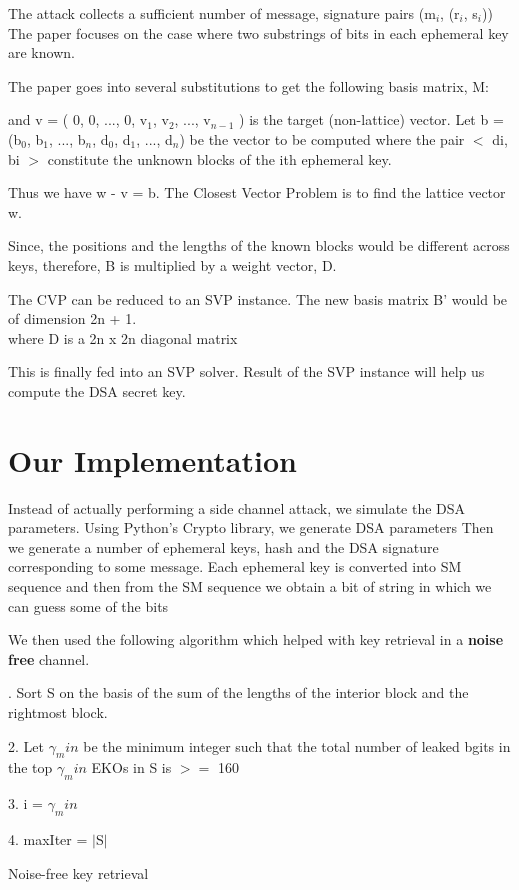 \documentclass[11pt]{article}
\begin{document}
The attack collects a sufficient number of message, signature pairs (m$_i$, (r$_i$, s$_i$))
The paper focuses on the case where two substrings of bits in each ephemeral key are known. 

The paper goes into several substitutions to get the following basis matrix, M:


and v = ( 0, 0, ..., 0, v$_1$, v$_2$, ..., v$_{n-1}$ ) is the target (non-lattice) vector.
Let b = (b$_0$, b$_1$, ..., b$_n$, d$_0$, d$_1$, ..., d$_n$) be the vector to be computed where the pair $<$ di, bi $>$ constitute the unknown blocks of the ith  ephemeral key. 

Thus we have w - v = b. The Closest Vector Problem is to find the lattice vector w. 

Since, the positions and the lengths of the known blocks would be different across keys, therefore, B is multiplied by a weight vector, D.

\pagebreak
The CVP can be reduced to an SVP instance. The new basis matrix B’ would be of dimension 2n + 1. \\


where D is a 2n x 2n diagonal matrix 

This is finally fed into an SVP solver.
Result of the SVP instance will help us compute the DSA secret key.

\section{Our Implementation}

Instead of actually performing a side channel attack, we simulate the DSA parameters. Using Python’s Crypto library, we generate DSA parameters
Then we generate a number of ephemeral keys, hash and the DSA signature corresponding to some message. Each ephemeral key is converted into SM sequence and then from the SM sequence we obtain a bit of string in which we can guess some of the bits\\



\pagebreak

We then used the following algorithm which helped with key retrieval in a \textbf{noise free} channel.\\


\begin{algorithm}[H]
. Sort S on the basis of the sum of the lengths of the interior block and the rightmost block.

2. Let $\gamma_min$ be the minimum integer such that the total number of leaked bgits in the top $\gamma_min$ EKOs in S is $>=$ 160

3. i = $\gamma_min$

4. maxIter = $|$S$|$

 \caption{Noise-free key retrieval}
\end{algorithm}
\end{document}
